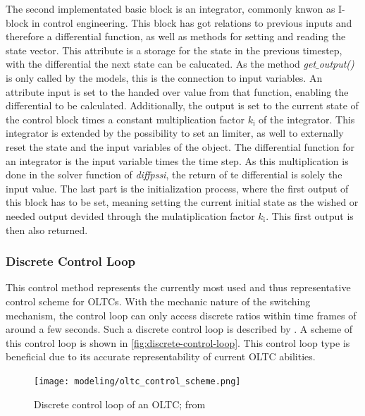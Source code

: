 The second implementated basic block is an integrator, commonly knwon as I-block in control engineering.
This block has got relations to previous inputs and therefore a differential function, as well as methods for setting and reading the state vector.
This attribute is a storage for the state in the previous timestep, with the differential the next state can be calucated.
As the method \textit{get$\_$output()} is only called by the models, this is the connection to input variables.
An attribute input is set to the handed over value from that function, enabling the differential to be calculated.
Additionally, the output is set to the current state of the control block times a constant multiplication factor $k_\mathrm{i}$ of the integrator.
This integrator is extended by the possibility to set an limiter, as well to externally reset the state and the input variables of the object.
The differential function for an integrator is the input variable times the time step.
As this multiplication is done in the solver function of \textit{diffpssi}, the return of te differential is solely the input value.
The last part is the initialization process, where the first output of this block has to be set, meaning setting the current initial state as the wished or needed output devided through the mulatiplication factor $k_\mathrm{i}$.
This first output is then also returned.

\subsubsection{Discrete Control Loop}

This control method represents the currently most used and thus representative control scheme for \acsp{OLTC}. 
With the mechanic nature of the switching mechanism, the control loop can only access discrete ratios within time frames of around a few seconds. 
Such a discrete control loop is described by \textcite{milano_2011,milano_2010}. 
A scheme of this control loop is shown in \autoref{fig:discrete-control-loop}.
This control loop type is beneficial due to its accurate representability of current \acs{OLTC} abilities. 

\begin{figure}[htbp!]
        \centering
        \texttt{[image: modeling/oltc\_control\_scheme.png]}
        \caption{Discrete control loop of an \acs{OLTC}; from \textcite{milano_2011}}
        \label{fig:discrete-control-loop}
\end{figure}

